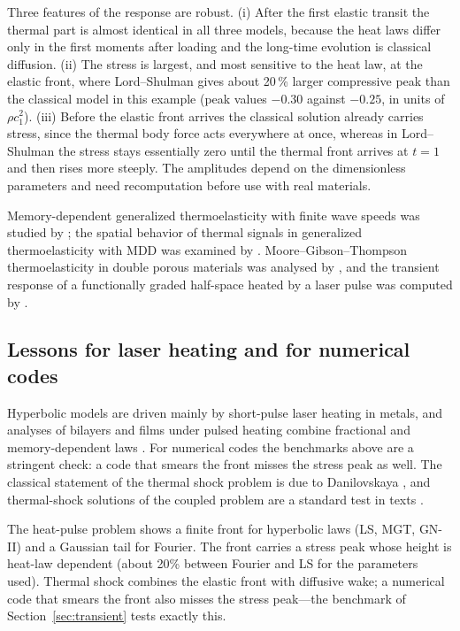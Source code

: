 Three features of the response are robust. (i) After the first elastic transit the thermal part is almost identical in all three models, because the heat laws differ only in the first moments after loading and the long-time evolution is classical diffusion. (ii) The stress is largest, and most sensitive to the heat law, at the elastic front, where Lord--Shulman gives about 20\,\% larger compressive peak than the classical model in this example (peak values $-0.30$ against $-0.25$, in units of $\rho c_1^2$). (iii) Before the elastic front arrives the classical solution already carries stress, since the thermal body force acts everywhere at once, whereas in Lord--Shulman the stress stays essentially zero until the thermal front arrives at $t=1$ and then rises more steeply. The amplitudes depend on the dimensionless parameters and need recomputation before use with real materials.

Memory-dependent generalized thermoelasticity with finite wave speeds was studied by \citep{Sarkar2021}; the spatial behavior of thermal signals in generalized thermoelasticity with MDD was examined by \citep{Sarkar2020}. Moore--Gibson--Thompson thermoelasticity in double porous materials was analysed by \citep{Florea2021}, and the transient response of a functionally graded half-space heated by a laser pulse was computed by \citep{Li2020}.

\subsection{Lessons for laser heating and for numerical codes}
Hyperbolic models are driven mainly by short-pulse laser heating in metals, and analyses of bilayers and films under pulsed heating combine fractional and memory-dependent laws \citep{Li2019}. For numerical codes the benchmarks above are a stringent check: a code that smears the front misses the stress peak as well. The classical statement of the thermal shock problem is due to Danilovskaya \citep{Danilovskaya1950}, and thermal-shock solutions of the coupled problem are a standard test in texts \citep{Boley1960,Nowacki1975,HetnarskiIgnaczak1999}.

\begin{summarybox}[Summary]
The heat-pulse problem shows a finite front for hyperbolic laws (LS, MGT, GN-II) and a Gaussian tail for Fourier. The front carries a stress peak whose height is heat-law dependent (about 20\% between Fourier and LS for the parameters used). Thermal shock combines the elastic front with diffusive wake; a numerical code that smears the front also misses the stress peak---the benchmark of Section~\ref{sec:transient} tests exactly this.
\end{summarybox}
